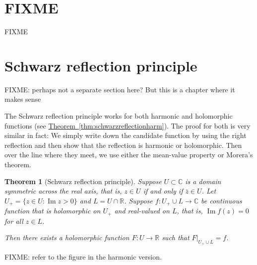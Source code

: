 \documentclass[12pt,openany]{book}
\renewcommand{\Im}{\operatorname{Im}}
\newcommand{\C}{{\mathbb{C}}}
\newcommand{\R}{{\mathbb{R}}}
\theoremstyle{plain}
\newtheorem{thm}{Theorem}[section]
\theoremstyle{remark}
\theoremstyle{definition}
\theoremstyle{exercise}
\theoremstyle{example}
\newcommand{\thmref}[1]{\hyperref[#1]{Theorem~\ref*{#1}}}
\begin{document}
\section{FIXME}
\label{sec:FIXMEanalcont}

FIXME


\section{Schwarz reflection principle}

FIXME: perhaps not a separate section here?  But this is a chapter where it
makes sense

The Schwarz reflection principle works for both harmonic and holomorphic
functions (see \thmref{thm:schwarzreflectionharm}).  The proof for both is
very similar in fact: We simply write down the candidate function by using
the right reflection and then show that the reflection is harmonic or
holomorphic.  Then over the line where they meet, we use either the
mean-value property or Morera's theorem.

\begin{thm}[Schwarz reflection principle]
\label{thm:schwarzreflectionholo}
Suppose $U \subset \C$ is a domain symmetric across the real axis, that is,
$z \in U$ if and only if $\bar{z} \in U$.
Let $U_+ = \{ z \in U : \Im z > 0 \}$ and $L = U \cap \R$.
Suppose $f \colon U_+ \cup L \to \C$ be continuous function that is
holomorphic on $U_+$ and real-valued on $L$, that is,
$\Im f(z) = 0$ for all $z \in L$.

Then there exists a holomorphic function $F \colon U \to \R$ such that
$F|_{U_+ \cup L} = f$.
\end{thm}

FIXME: refer to the figure in the harmonic version.
\end{document}
